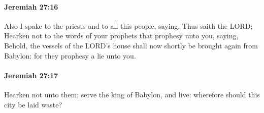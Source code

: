		\paragraph{Jeremiah 27:16} %
			\label{JEREMIAH-27-16}

			Also I spake to the priests and to all this people, saying, Thus saith the LORD; Hearken not to the words of your prophets that prophesy unto you, saying, Behold, the vessels of the LORD’s house shall now shortly be brought again from Babylon: for they prophesy a lie unto you.


		\paragraph{Jeremiah 27:17} %
			\label{JEREMIAH-27-17}

			Hearken not unto them; serve the king of Babylon, and live: wherefore should this city be laid waste?

